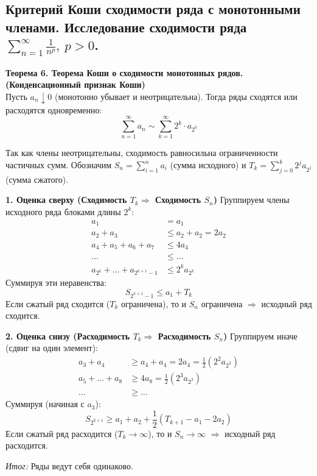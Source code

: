 \subsection{Критерий Коши сходимости ряда с монотонными членами. Исследование сходимости ряда $ \sum_{n = 1}^{\infty} \frac{1}{n^p},\ p > 0 $.}

\textbf{Теорема 6. Теорема Коши о сходимости монотонных рядов. (Конденсационный признак Коши)} \\
Пусть $a_n \downarrow 0$ (монотонно убывает и неотрицательна). Тогда ряды сходятся или расходятся одновременно:
\[ \sum^{\infty}_{n=1} a_n \sim \sum^{\infty}_{k=1} 2^k \cdot a_{2^k} \]

\begin{tcolorbox}[title=Доказательство, breakable]
    Так как члены неотрицательны, сходимость равносильна ограниченности частичных сумм.
    Обозначим $S_n = \sum_{i=1}^n a_i$ (сумма исходного) и $T_k = \sum_{j=0}^k 2^j a_{2^j}$ (сумма сжатого).

    \textbf{1. Оценка сверху (Сходимость $T_k \Rightarrow$ Сходимость $S_n$)}
    Группируем члены исходного ряда блоками длины $2^k$:
    \[
    \begin{aligned}
        a_1 &= a_1 \\
        a_2 + a_3 &\leq a_2 + a_2 = 2a_2 \\
        a_4 + a_5 + a_6 + a_7 &\leq 4a_4 \\
        \dots &\leq \dots \\
        a_{2^k} + \dots + a_{2^{k+1}-1} &\leq 2^k a_{2^k}
    \end{aligned}
    \]
    Суммируя эти неравенства:
    \[ S_{2^{k+1}-1} \leq a_1 + T_k \]
    Если сжатый ряд сходится ($T_k$ ограничена), то и $S_n$ ограничена $\Rightarrow$ исходный ряд сходится.

    \textbf{2. Оценка снизу (Расходимость $T_k \Rightarrow$ Расходимость $S_n$)}
    Группируем иначе (сдвиг на один элемент):
    \[
    \begin{aligned}
        a_3 + a_4 &\geq a_4 + a_4 = 2a_4 = \frac{1}{2} (2^2 a_{2^2}) \\
        a_5 + \dots + a_8 &\geq 4a_8 = \frac{1}{2} (2^3 a_{2^3}) \\
        \dots &\geq \dots
    \end{aligned}
    \]
    Суммируя (начиная с $a_3$):
    \[ S_{2^{k+1}} \geq a_1 + a_2 + \frac{1}{2} (T_{k+1} - a_1 - 2a_2) \]
    Если сжатый ряд расходится ($T_k \to \infty$), то и $S_n \to \infty$ $\Rightarrow$ исходный ряд расходится.
    
    \textit{Итог:} Ряды ведут себя одинаково.
\end{tcolorbox}

